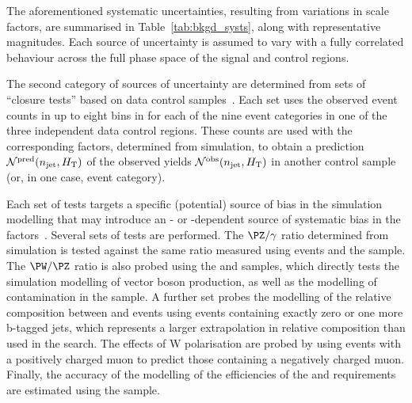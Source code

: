 The aforementioned systematic uncertainties, resulting from variations
in scale factors, are summarised in Table~\ref{tab:bkgd_systs}, along
with representative magnitudes.  Each source of uncertainty is assumed
to vary with a fully correlated behaviour across the full phase space
of the signal and control regions.

The second category of sources of uncertainty are determined from sets
of ``closure tests'' based on data control
samples~\cite{RA1Paper2012}. Each set uses the observed event counts
in up to eight bins in \scalht for each of the nine \njet event
categories in one of the three independent data control regions. These
counts are used with the corresponding \tf factors, determined from
simulation, to obtain a prediction $\mathcal{N}^\text{pred}(n_{\text{jet}},
H_{\mathrm{T}})$ of the observed yields $\mathcal{N}^\text{obs}(n_{\text{jet}},
H_{\mathrm{T}})$ in another control sample (or, in one case, \nb event
category).

Each set of tests targets a specific (potential) source of bias in the
simulation modelling that may introduce an \njet- or \scalht-dependent
source of systematic bias in the \tf factors~\cite{RA1Paper2012}. Several
sets of tests are performed. The $\PZ/\gamma$ ratio determined from
simulation is tested against the same ratio measured using \zmumuj
events and the \gj sample.
The $\PW/\PZ$ ratio is also probed using the \mj and \mmj
samples, which directly tests the simulation modelling of vector
boson production, as well as the modelling of \ttbar contamination in
the \mj sample. 
A further set probes the modelling of the relative composition between
\wlj and \ttbar events using \mj events containing exactly zero or one
more b-tagged jets, which represents a larger extrapolation in
relative composition than used in the search.  The effects of W
polarisation are probed by using \mj events with a positively charged
muon to predict those containing a negatively charged muon. Finally,
the accuracy of the modelling of the efficiencies of the \alphat and
\bdphi requirements are estimated using the \mj sample.

